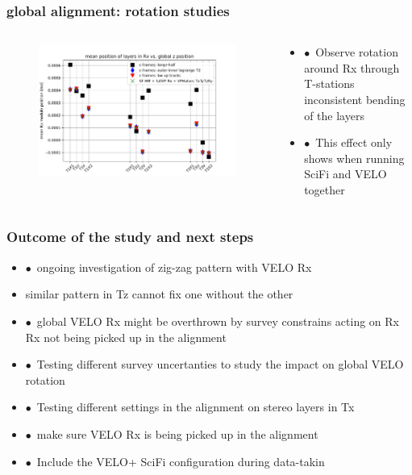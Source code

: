 \documentclass[aspectratio=1610, 12pt, xcolor=dvipsnames]{beamer}
\begin{document}
\begin{frame}\frametitle{global alignment: rotation studies}
  \begin{columns}
    \begin{column}[c]{0.48\textwidth}
      \begin{figure}
        \centering
        \includegraphics[width=\textwidth]{plots/outfiles_vs_global/all_runs_fix_glob_z_vs_local_Rx.pdf}
      \end{figure}
    \end{column}
    \begin{column}[c]{0.48\textwidth}
      \begin{itemize}
        \item $\bullet$\, Observe rotation around Rx through T-stations \to inconsistent bending of the layers
        \item $\bullet$\, This effect only shows when running SciFi and VELO together
      \end{itemize}
    \end{column}
  \end{columns}
\end{frame}

\begin{frame}\frametitle{Outcome of the study and next steps}
  \begin{itemize}
    \setlength\itemsep{0em}
    \item $\bullet$\, ongoing investigation of zig-zag pattern with VELO Rx
    \item \to similar pattern in Tz \to cannot fix one without the other
    \item $\bullet$\, global VELO Rx might be overthrown by survey constrains acting on Rx \to Rx not being picked up in the alignment
    \item $\bullet$\, Testing different survey uncertanties to study the impact on global VELO rotation
    \item $\bullet$\, Testing different settings in the alignment on stereo layers in Tx
    \item $\bullet$\, make sure VELO Rx is being picked up in the alignment
    \item $\bullet$\, Include the VELO+ SciFi configuration during data-takin
  \end{itemize}
\end{frame}
\end{document}
